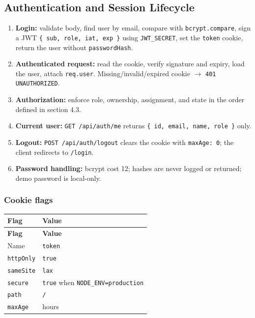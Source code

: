 \documentclass[11pt,a4paper]{article}
\begin{document}
\subsection{Authentication and Session Lifecycle}

\begin{enumerate}[leftmargin=*,itemsep=2pt,topsep=2pt]
  \item \textbf{Login:} validate body, find user by email, compare with \texttt{bcrypt.compare}, sign a JWT \texttt{\{ sub, role, iat, exp \}} using \texttt{JWT\_SECRET}, set the \texttt{token} cookie, return the user without \texttt{passwordHash}.
  \item \textbf{Authenticated request:} read the cookie, verify signature and expiry, load the user, attach \texttt{req.user}. Missing/invalid/expired cookie $\rightarrow$ \texttt{401 UNAUTHORIZED}.
  \item \textbf{Authorization:} enforce role, ownership, assignment, and state in the order defined in section 4.3.
  \item \textbf{Current user:} \texttt{GET /api/auth/me} returns \texttt{\{ id, email, name, role \}} only.
  \item \textbf{Logout:} \texttt{POST /api/auth/logout} clears the cookie with \texttt{maxAge: 0}; the client redirects to \texttt{/login}.
  \item \textbf{Password handling:} bcrypt cost 12; hashes are never logged or returned; demo password is local-only.
\end{enumerate}
\subsubsection{Cookie flags}

\vspace{0.3em}
\begin{longtable}{|>{\RaggedRight}p{4.5cm}|>{\RaggedRight}p{11.3cm}|}
\hline
\rowcolor{zenPale}\textbf{Flag} & \textbf{Value} \\ \hline
\endfirsthead
\hline
\rowcolor{zenPale}\textbf{Flag} & \textbf{Value} \\ \hline
\endhead
\hline
\endfoot
Name & \texttt{token} \\ \hline
\texttt{httpOnly} & \texttt{true} \\ \hline
\texttt{sameSite} & \texttt{lax} \\ \hline
\texttt{secure} & \texttt{true} when \texttt{NODE\_\allowbreak ENV=production} \\ \hline
\texttt{path} & \texttt{/\allowbreak } \\ \hline
\texttt{maxAge} & 8 hours \\ \hline
\end{longtable}
\vspace{0.3em}
\end{document}
